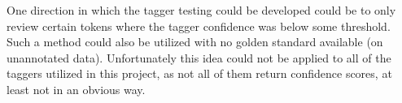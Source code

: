 One direction in which the tagger testing could be developed could be to only review certain tokens where the tagger confidence was below some threshold. Such a method could also be utilized with no golden standard available (on unannotated data). Unfortunately this idea could not be applied to all of the taggers utilized in this project, as not all of them return confidence scores, at least not in an obvious way.


